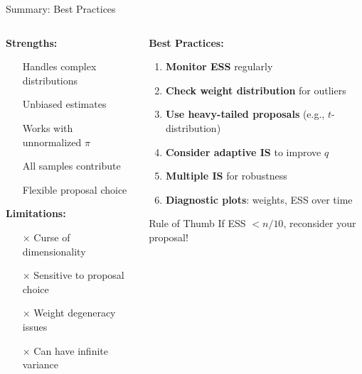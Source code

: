 \documentclass[aspectratio=169]{beamer}
\begin{document}
\begin{frame}{Summary: Best Practices}
\begin{columns}
\begin{column}{0.5\textwidth}
\textbf{Strengths:}
\begin{itemize}
\item[\checkmark] Handles complex distributions
\item[\checkmark] Unbiased estimates
\item[\checkmark] Works with unnormalized $\pi$
\item[\checkmark] All samples contribute
\item[\checkmark] Flexible proposal choice
\end{itemize}

\vspace{0.3cm}
\textbf{Limitations:}
\begin{itemize}
\item[$\times$] Curse of dimensionality
\item[$\times$] Sensitive to proposal choice
\item[$\times$] Weight degeneracy issues
\item[$\times$] Can have infinite variance
\end{itemize}
\end{column}

\begin{column}{0.5\textwidth}
\textbf{Best Practices:}
\begin{enumerate}
\item \textbf{Monitor ESS} regularly
\item \textbf{Check weight distribution} for outliers
\item \textbf{Use heavy-tailed proposals} (e.g., $t$-distribution)
\item \textbf{Consider adaptive IS} to improve $q$
\item \textbf{Multiple IS} for robustness
\item \textbf{Diagnostic plots}: weights, ESS over time
\end{enumerate}

\vspace{0.3cm}
\begin{block}{Rule of Thumb}
If ESS $< n/10$, reconsider your proposal!
\end{block}
\end{column}
\end{columns}
\end{frame}
\end{document}
